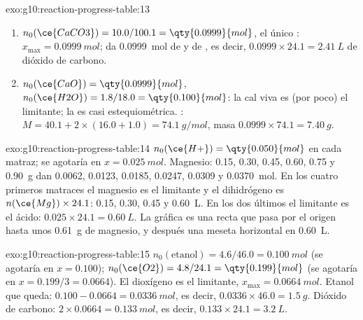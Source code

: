 \begin{solution}{exo:g10:reaction-progress-table:13}
\begin{enumerate}
  \item $n_0(\ce{CaCO3}) = 10.0 / 100.1 = \qty{0.0999}{mol}$, el único
        : $x_{\max} = \qty{0.0999}{mol}$; da \qty{0.0999}{mol}
        de  y de , es decir,
        $0.0999 \times 24.1 = \qty{2.41}{L}$ de dióxido de carbono.
  \item $n_0(\ce{CaO}) = \qty{0.0999}{mol}$, $n_0(\ce{H2O}) = 1.8 / 18.0
        = \qty{0.100}{mol}$: la cal viva es (por poco) el limitante; la
         es casi estequiométrica. :
        $M = 40.1 + 2 \times (16.0 + 1.0) = \qty{74.1}{g/mol}$, masa
        $0.0999 \times 74.1 = \qty{7.40}{g}$.
\end{enumerate}
\end{solution}

\begin{solution}{exo:g10:reaction-progress-table:14}
$n_0(\ce{H+}) = \qty{0.050}{mol}$ en cada matraz; se agotaría en
$x = \qty{0.025}{mol}$. Magnesio: 0.15, 0.30, 0.45, 0.60, 0.75 y
\qty{0.90}{g} dan 0.0062, 0.0123, 0.0185, 0.0247, 0.0309 y
\qty{0.0370}{mol}. En los cuatro primeros matraces el magnesio es el
limitante y el dihidrógeno es $n(\ce{Mg}) \times 24.1$: 0.15, 0.30, 0.45
y \qty{0.60}{L}. En los dos últimos el limitante es el ácido: $0.025 \times 24.1
= \qty{0.60}{L}$. La gráfica es una recta que pasa
por el origen hasta unos \qty{0.61}{g} de magnesio, y después una
meseta horizontal en \qty{0.60}{L}.
\end{solution}

\begin{solution}{exo:g10:reaction-progress-table:15}
$n_0(\text{etanol}) = 4.6 / 46.0 = \qty{0.100}{mol}$ (se agotaría en
$x = 0.100$); $n_0(\ce{O2}) = 4.8 / 24.1 = \qty{0.199}{mol}$ (se
agotaría en $x = 0.199/3 = 0.0664$). El dioxígeno es el limitante,
$x_{\max} = \qty{0.0664}{mol}$. Etanol que queda: $0.100 - 0.0664 =
\qty{0.0336}{mol}$, es decir, $0.0336 \times 46.0 = \qty{1.5}{g}$.
Dióxido de carbono: $2 \times 0.0664 = \qty{0.133}{mol}$, es decir,
$0.133 \times 24.1 = \qty{3.2}{L}$.
\end{solution}

